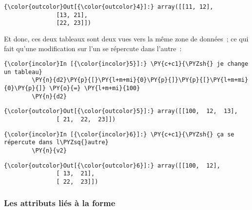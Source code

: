 \begin{Verbatim}[commandchars=\\\{\},frame=single,framerule=0.3mm,rulecolor=\color{cellframecolor}]
{\color{outcolor}Out[{\color{outcolor}4}]:} array([[11, 12],
               [13, 21],
               [22, 23]])
\end{Verbatim}
            
    Et donc, ces deux tableaux sont deux vues vers la même zone de données~;
ce qui fait qu'une modification sur l'un se répercute dans l'autre~:

    \begin{Verbatim}[commandchars=\\\{\},frame=single,framerule=0.3mm,rulecolor=\color{cellframecolor}]
{\color{incolor}In [{\color{incolor}5}]:} \PY{c+c1}{\PYZsh{} je change un tableau}
        \PY{n}{d2}\PY{p}{[}\PY{l+m+mi}{0}\PY{p}{]}\PY{p}{[}\PY{l+m+mi}{0}\PY{p}{]} \PY{o}{=} \PY{l+m+mi}{100}
        \PY{n}{d2}
\end{Verbatim}


\begin{Verbatim}[commandchars=\\\{\},frame=single,framerule=0.3mm,rulecolor=\color{cellframecolor}]
{\color{outcolor}Out[{\color{outcolor}5}]:} array([[100,  12,  13],
               [ 21,  22,  23]])
\end{Verbatim}
            
    \begin{Verbatim}[commandchars=\\\{\},frame=single,framerule=0.3mm,rulecolor=\color{cellframecolor}]
{\color{incolor}In [{\color{incolor}6}]:} \PY{c+c1}{\PYZsh{} ça se répercute dans l\PYZsq{}autre}
        \PY{n}{v2}
\end{Verbatim}


\begin{Verbatim}[commandchars=\\\{\},frame=single,framerule=0.3mm,rulecolor=\color{cellframecolor}]
{\color{outcolor}Out[{\color{outcolor}6}]:} array([[100,  12],
               [ 13,  21],
               [ 22,  23]])
\end{Verbatim}
            
    \hypertarget{les-attributs-liuxe9s-uxe0-la-forme}{%
\subsubsection{Les attributs liés à la
forme}\label{les-attributs-liuxe9s-uxe0-la-forme}}

